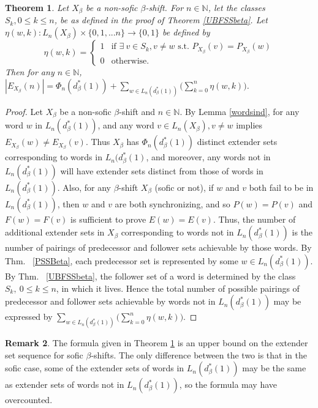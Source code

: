 \documentclass{amsart}
\newtheorem{theorem}{Theorem}[section]
\theoremstyle{definition}
\newtheorem{remark}[theorem]{Remark}
\numberwithin{equation}{section}
\begin{document}
\begin{theorem}\label{nonsoficformula}
Let $X_\beta$ be a non-sofic $\beta$-shift. For $n \in \mathbb{N}$, let the classes $S_k, 0\leq k \leq n$, be as defined in the proof of Theorem \ref{UBFSSbeta}. Let $\eta(w,k): L_n(X_\beta) \times \{0, 1, ...n\} \rightarrow \{0,1\}$ be defined by 
$$\eta (w,k) = \begin{cases}
1 & \text{if } \exists \> v \in S_k, v\neq w \text{ s.t. } P_{X_\beta}(v) = P_{X_\beta}(w)\\
0 & \text{otherwise}.
\end{cases}
$$
Then for any $n \in \mathbb{N}$, $|E_{X_\beta}(n)| = \displaystyle \Phi_n(d_\beta^*(1)) + \sum_{w \in L_n(d_\beta^*(1))} \Big( \sum_{k=0}^n \eta (w,k) \Big)$.
\end{theorem}

\begin{proof}
Let $X_\beta$ be a non-sofic $\beta$-shift and $n \in \mathbb{N}$. By Lemma \ref{wordsind}, for any word $w$ in $L_n(d_\beta^*(1))$, and any word $v \in L_n(X_\beta), v \neq w$ implies $E_{X_\beta}(w) \neq E_{X_\beta}(v)$. Thus $X_\beta$ has $\Phi_n(d_\beta^*(1))$ distinct extender sets corresponding to words in $L_n(d_\beta^*(1)$, and moreover, any words not in $L_n(d_\beta^*(1))$ will have extender sets distinct from those of words in $L_n(d_\beta^*(1))$. Also, for any $\beta$-shift $X_\beta$ (sofic or not), if $w$ and $v$ both fail to be in $L_n(d_\beta^*(1))$, then $w$ and $v$ are both synchronizing, and so $P(w) = P(v)$ and $F(w) = F(v)$ is sufficient to prove $E(w) = E(v)$. Thus, the number of additional extender sets in $X_\beta$ corresponding to words not in $L_n(d_\beta^*(1))$ is the number of pairings of predecessor and follower sets achievable by those words. By Thm. ~\ref{PSSBeta}, each predecessor set is represented by some $w \in L_n(d_\beta^*(1))$. By Thm. ~\ref{UBFSSbeta}, the follower set of a word is determined by the class $S_k, \ 0 \leq k \leq n$, in which it lives. Hence the total number of possible pairings of predecessor and follower sets achievable by words not in $L_n(d_\beta^*(1))$ may be expressed by $\displaystyle \sum_{w \in L_n(d_\beta^*(1))} \Big( \sum_{k=0}^n \eta (w,k) \Big)$.
\end{proof}

\begin{remark}\label{soficincl}
The formula given in Theorem \ref{nonsoficformula} is an upper bound on the extender set sequence for sofic $\beta$-shifts. The only difference between the two is that in the sofic case, some of the extender sets of words in $L_n(d_\beta^*(1))$ may be the same as extender sets of words not in $L_n(d_\beta^*(1))$, so the formula may have overcounted.
\end{remark}
\end{document}
